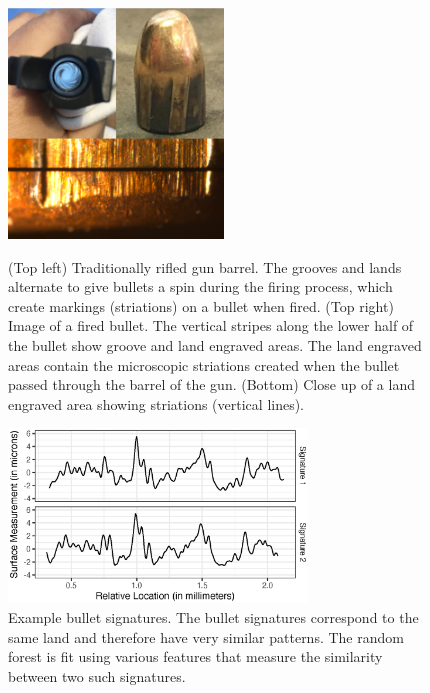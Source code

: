 \documentclass[AMS,STIX2COL]{WileyNJD-v2}\usepackage[]{graphicx}\usepackage[]{color}
\newenvironment{knitrout}{}{} %
\begin{document}
\begin{figure}[!t]
\centering
\begin{knitrout}
\color{fgcolor}

{\centering \includegraphics[width=2.25in]{figure-08-1} 

}



\end{knitrout}
\caption{(Top left) Traditionally rifled gun barrel. The grooves and lands alternate to give bullets a spin during the firing process, which create markings (striations) on a bullet when fired. (Top right) Image of a fired bullet. The vertical stripes along the lower half of the bullet show groove and land engraved areas. The land engraved areas contain the microscopic striations created when the bullet passed through the barrel of the gun. (Bottom) Close up of a land engraved area showing striations (vertical lines).}
\label{fig:figure-08}

\vspace*{\floatsep}

\begin{knitrout}
\color{fgcolor}

{\centering \includegraphics[width=3.125in]{figure-09-1} 

}



\end{knitrout}
\caption{Example bullet signatures. The bullet signatures correspond to the same land and therefore have very similar patterns. The \citet{hare:2017} random forest is fit using various features that measure the similarity between two such signatures.}
\label{fig:figure-09}
\end{figure}
\end{document}
